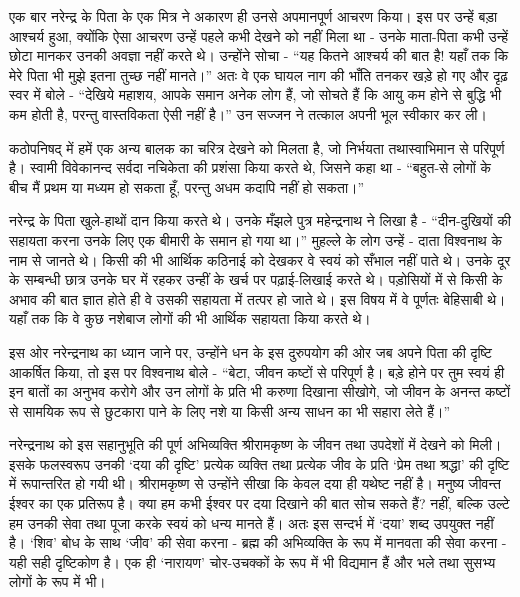 एक बार नरेन्द्र के पिता के एक मित्र ने अकारण ही उनसे अपमानपूर्ण आचरण किया। इस पर उन्हें बड़ा आश्चर्य हुआ, क्योंकि ऐसा आचरण उन्हें पहले कभी देखने को नहीं मिला था - उनके माता-पिता कभी उन्हें छोटा मानकर उनकी अवज्ञा नहीं करते थे। उन्होंने सोचा - “यह कितने आश्चर्य की बात है! यहाँ तक कि मेरे पिता भी मुझे इतना तुच्छ नहीं मानते।” अतः वे एक घायल नाग की भाँति तनकर खड़े हो गए और दृढ़ स्वर में बोले - “देखिये महाशय, आपके समान अनेक लोग हैं, जो सोचते हैं कि आयु कम होने से बुद्धि भी कम होती है, परन्तु वास्तविकता ऐसी नहीं है।” उन सज्जन ने तत्काल अपनी भूल स्वीकार कर ली। 

कठोपनिषद् में हमें एक अन्य बालक का चरित्र देखने को मिलता है, जो निर्भयता तथा\break स्वाभिमान से परिपूर्ण है। स्वामी विवेकानन्द सर्वदा नचिकेता की प्रशंसा किया करते थे, जिसने कहा था - “बहुत-से लोगों के बीच मैं प्रथम या मध्यम हो सकता हूँ, परन्तु अधम कदापि नहीं हो सकता।” 

\delimiter

नरेन्द्र के पिता खुले-हाथों दान किया करते थे। उनके मँझले पुत्र महेन्द्रनाथ ने लिखा है - “दीन-दुखियों की सहायता करना उनके लिए एक बीमारी के समान हो गया था।” मुहल्ले के लोग उन्हें - दाता विश्वनाथ के नाम से जानते थे। किसी की भी आर्थिक कठिनाई को देखकर वे स्वयं को सँभाल नहीं पाते थे। उनके दूर के सम्बन्धी छात्र उनके घर में रहकर उन्हीं के खर्च पर पढ़ाई-लिखाई करते थे। पड़ोसियों में से किसी के अभाव की बात ज्ञात होते ही वे उसकी सहायता में तत्पर हो जाते थे। इस विषय में वे पूर्णतः बेहिसाबी थे। यहाँ तक कि वे कुछ नशेबाज लोगों की भी आर्थिक सहायता किया करते थे। 

इस ओर नरेन्द्रनाथ का ध्यान जाने पर, उन्होंने धन के इस दुरुपयोग की ओर जब अपने पिता की दृष्टि आकर्षित किया, तो इस पर विश्वनाथ बोले - “बेटा, जीवन कष्टों से परिपूर्ण है। बड़े होने पर तुम स्वयं ही इन बातों का अनुभव करोगे और उन लोगों के प्रति भी करुणा दिखाना सीखोगे, जो जीवन के अनन्त कष्टों से सामयिक रूप से छुटकारा पाने के लिए नशे या किसी अन्य साधन का भी सहारा लेते हैं।” 

नरेन्द्रनाथ को इस सहानुभूति की पूर्ण अभिव्यक्ति श्रीरामकृष्ण के जीवन तथा उपदेशों में देखने को मिली। इसके फलस्वरूप उनकी ‘दया की दृष्टि’ प्रत्येक व्यक्ति तथा प्रत्येक जीव के प्रति ‘प्रेम तथा श्रद्धा’ की दृष्टि में रूपान्तरित हो गयी थी। श्रीरामकृष्ण से उन्होंने सीखा कि केवल दया ही यथेष्ट नहीं है। मनुष्य जीवन्त ईश्वर का एक प्रतिरूप है। क्या हम कभी ईश्वर पर दया दिखाने की बात सोच सकते हैं? नहीं, बल्कि उल्टे हम उनकी सेवा तथा पूजा करके स्वयं को धन्य मानते हैं। अतः इस सन्दर्भ में ‘दया’ शब्द उपयुक्त नहीं है। ‘शिव’ बोध के साथ ‘जीव’ की सेवा करना - ब्रह्म की अभिव्यक्ति के रूप में मानवता की सेवा करना - यही सही दृष्टिकोण है। एक ही ‘नारायण’ चोर-उचक्कों के रूप में भी विद्यमान हैं और भले तथा सुसभ्य लोगों के रूप में भी। 

